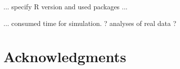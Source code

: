 \documentclass[article]{jss}
\begin{document}
... specify R version and used packages ...

... consumed time for simulation. ? analyses of real data ?



\section*{Acknowledgments}








\newpage
\end{document}
